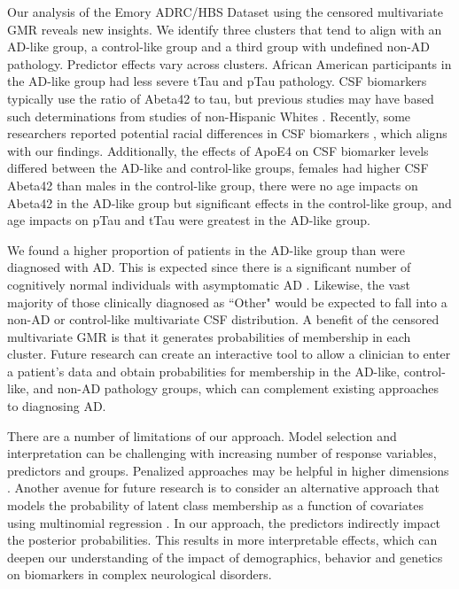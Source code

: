 \documentclass{interact}
\theoremstyle{plain}
\theoremstyle{definition}
\theoremstyle{remark}
\begin{document}
Our analysis of the Emory ADRC/HBS Dataset using the censored multivariate GMR reveals new insights. We identify three clusters that tend to align with an AD-like group, a control-like group and a third group with undefined non-AD pathology. Predictor effects vary across clusters. African American participants in the AD-like group had less severe tTau and pTau pathology. CSF biomarkers typically use the ratio of Abeta42 to tau, but previous studies may have based such determinations from studies of non-Hispanic Whites \citep{Meyer2010}. Recently, some researchers reported potential racial differences in CSF biomarkers \citep{Morris2019,garrett2019racial}, which aligns with our findings. Additionally, the effects of ApoE4 on CSF biomarker levels differed between the AD-like and control-like groups, females had higher CSF Abeta42 than males in the control-like group, there were no age impacts on Abeta42 in the AD-like group but significant effects in the control-like group, and age impacts on pTau and tTau were greatest in the AD-like group.

We found a higher proportion of patients in the AD-like group than were diagnosed with AD. This is expected since there is a significant number of cognitively normal individuals with asymptomatic AD  \citep{Jansen2022PrevalenceSpectrum,Jansen2015PrevalenceMeta-analysis}. Likewise, the vast majority of those clinically diagnosed as ``Other" would be expected to fall into a non-AD or control-like multivariate CSF distribution. A benefit of the censored multivariate GMR is that it generates probabilities of membership in each cluster. Future research can create an interactive tool to allow a  clinician to enter a patient's data and obtain probabilities for membership in the AD-like, control-like, and non-AD pathology groups, which can complement existing approaches to diagnosing AD.

There are a number of limitations of our approach. Model selection and interpretation can be challenging with increasing number of response variables, predictors and groups. Penalized approaches may be helpful in higher dimensions \citep{Khalili2013,Xie2010}. Another avenue for future research is to consider an alternative approach that models the probability of latent class membership as a function of covariates using multinomial regression \citep{Jacobs1991}. In our approach, the predictors indirectly impact the posterior probabilities. This results in more interpretable effects, which can deepen our understanding of the impact of demographics, behavior and genetics on biomarkers in complex neurological disorders.
\end{document}

